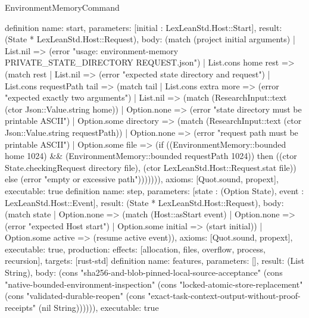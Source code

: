 \begin{lexlean}{EnvironmentMemoryCommand}
\begin{semanticmodule}
{}
definition{
 name: start, parameters: [initial : LexLeanStd.Host::Start], result: (State * LexLeanStd.Host::Request),
 body: (match (project initial arguments) | List.nil => (error "usage: environment-memory PRIVATE_STATE_DIRECTORY REQUEST.json") | List.cons home rest => (match rest | List.nil => (error "expected state directory and request") | List.cons requestPath tail => (match tail | List.cons extra more => (error "expected exactly two arguments") | List.nil => (match (ResearchInput::text (ctor Json::Value.string home)) | Option.none => (error "state directory must be printable ASCII") | Option.some directory => (match (ResearchInput::text (ctor Json::Value.string requestPath)) | Option.none => (error "request path must be printable ASCII") | Option.some file => (if ((EnvironmentMemory::bounded home 1024) && (EnvironmentMemory::bounded requestPath 1024)) then ((ctor State.checkingRequest directory file), (ctor LexLeanStd.Host::Request.stat file)) else (error "empty or excessive path"))))))), axioms: [Quot.sound, propext], executable: true
}
definition{
 name: step, parameters: [state : (Option State), event : LexLeanStd.Host::Event], result: (State * LexLeanStd.Host::Request),
 body: (match state | Option.none => (match (Host::asStart event) | Option.none => (error "expected Host start") | Option.some initial => (start initial)) | Option.some active => (resume active event)), axioms: [Quot.sound, propext], executable: true,
 production: {effects: [allocation, files, overflow, process, recursion], targets: [rust-std]}
}
definition{
 name: features, parameters: [], result: (List String),
 body: (cons "sha256-and-blob-pinned-local-source-acceptance" (cons "native-bounded-environment-inspection" (cons "locked-atomic-store-replacement" (cons "validated-durable-reopen" (cons "exact-task-context-output-without-proof-receipts" (nil String)))))), executable: true
}
\end{semanticmodule}
\end{lexlean}
